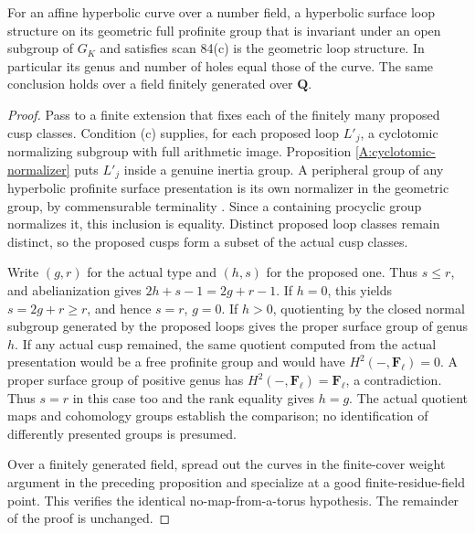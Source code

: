 \begin{proposition}
\label{A:unique-loops}
For an affine hyperbolic curve over a number field, a
hyperbolic surface loop structure on its geometric full
profinite group that is invariant under an open subgroup
of $G_K$ and satisfies scan 84(c) is the geometric loop
structure.  In particular its genus and number of holes
equal those of the curve.  The same conclusion holds
over a field finitely generated over $\mathbf Q$.
\end{proposition}
\begin{proof}
Pass to a finite extension that fixes each of the finitely
many proposed cusp classes.  Condition (c) supplies, for
each proposed loop $L'_j$, a cyclotomic normalizing subgroup
with full arithmetic image.  Proposition
\ref{A:cyclotomic-normalizer} puts $L'_j$ inside a genuine
inertia group.  A peripheral group of any hyperbolic
profinite surface presentation is its own normalizer in
the geometric group, by commensurable terminality
\cite[Lemma 1.3.7]{A_Mochizuki2004}.  Since a containing
procyclic group normalizes it, this inclusion is equality.
Distinct proposed loop classes remain distinct, so the
proposed cusps form a subset of the actual cusp classes.

Write $(g,r)$ for the actual type and $(h,s)$ for the
proposed one.  Thus $s\leq r$, and abelianization gives
$2h+s-1=2g+r-1$.  If $h=0$, this yields
$s=2g+r\geq r$, and hence $s=r$, $g=0$.
If $h>0$, quotienting by the closed normal subgroup
generated by the proposed loops gives the proper
surface group of genus $h$.  If any actual cusp
remained, the same quotient computed from the actual
presentation would be a free profinite group and
would have $H^2(-,\mathbf F_\ell)=0$.  A proper
surface group of positive genus has
$H^2(-,\mathbf F_\ell)=\mathbf F_\ell$, a contradiction.
Thus $s=r$ in this case too and the rank equality gives
$h=g$.  The actual quotient maps and cohomology groups
establish the comparison; no identification of differently
presented groups is presumed.

Over a finitely generated field, spread out the curves
in the finite-cover weight argument in the preceding
proposition and specialize at a good finite-residue-field
point.  This verifies the identical no-map-from-a-torus
hypothesis.  The remainder of the proof is unchanged.
\end{proof}


